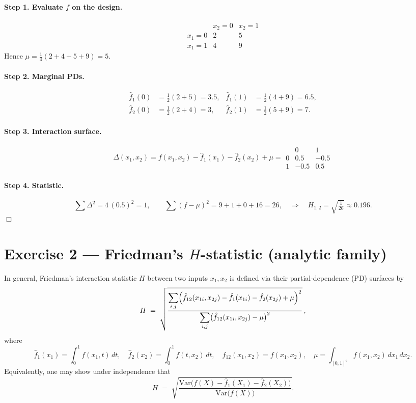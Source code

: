 \documentclass[a4paper]{article}
\begin{document}
\paragraph{Step 1.  Evaluate $f$ on the design.}
\[
\begin{array}{c|cc}
          & x_2=0 & x_2=1 \\ \hline
x_1=0 & 2 & 5 \\
x_1=1 & 4 & 9
\end{array}
\]
Hence $\mu=\tfrac14(2+4+5+9)=5$.

\paragraph{Step 2.  Marginal PDs.}
\[
\begin{aligned}
\hat f_{1}(0)&=\tfrac12(2+5)=3.5,  &
\hat f_{1}(1)&=\tfrac12(4+9)=6.5, \\
\hat f_{2}(0)&=\tfrac12(2+4)=3,    &
\hat f_{2}(1)&=\tfrac12(5+9)=7 .
\end{aligned}
\]

\paragraph{Step 3.  Interaction surface.}
\[
\Delta(x_1,x_2)=f(x_1,x_2)-\hat f_{1}(x_1)-\hat f_{2}(x_2)+\mu
=\begin{array}{c|cc}
          & 0 & 1 \\ \hline
0 & 0.5 & -0.5 \\
1 & -0.5 & 0.5
\end{array}
\]

\paragraph{Step 4.  Statistic.}
\[
\sum\Delta^2 =4\,(0.5)^2=1,
\qquad
\sum(f-\mu)^2 = 9+1+0+16 = 26,
\quad\Longrightarrow\quad
H_{1,2}= \sqrt{\tfrac{1}{26}}\approx 0.196.
\]
\hfill$\Box$
\section*{Exercise 2 — Friedman's $H$-statistic (analytic family)}
\label{ex:H_param}

In general, Friedman's interaction statistic $H$ between two inputs $x_1,x_2$ is defined via their partial‐dependence (PD) surfaces by
\[
H \;=\;
\sqrt{\frac{\displaystyle
    \sum_{i,j}
      \Bigl(\hat f_{12}(x_{1i},x_{2j})
            -\hat f_{1}(x_{1i})
            -\hat f_{2}(x_{2j})
            +\mu\Bigr)^{2}
  }{\displaystyle
    \sum_{i,j}
      \bigl(\hat f_{12}(x_{1i},x_{2j})-\mu\bigr)^{2}
  }}\,,
\]
where
\[
\hat f_{1}(x_1)=\int_0^1 f(x_1,t)\,dt,\quad
\hat f_{2}(x_2)=\int_0^1 f(t,x_2)\,dt,\quad
\hat f_{12}(x_1,x_2)=f(x_1,x_2),\quad
\mu=\int_{[0,1]^2} f(x_1,x_2)\,dx_1\,dx_2.
\]
Equivalently, one may show under independence that
\[
H \;=\;
\sqrt{\frac{\text{Var}\bigl(f(X)-\hat f_1(X_1)-\hat f_2(X_2)\bigr)}
           {\text{Var}\bigl(f(X)\bigr)}}.
\]
\end{document}
